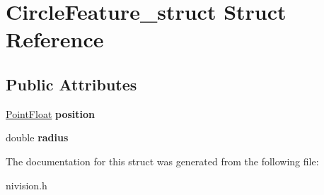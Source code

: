 \hypertarget{structCircleFeature__struct}{\section{\-Circle\-Feature\-\_\-struct \-Struct \-Reference}
\label{structCircleFeature__struct}
}
\subsection*{\-Public \-Attributes}
\begin{DoxyCompactItemize}
\item 
\hypertarget{structCircleFeature__struct_aa34aafa6b2b2462e2c330754e37bb0fd}{\hyperlink{structPointFloat__struct}{\-Point\-Float} {\bfseries position}}\label{structCircleFeature__struct_aa34aafa6b2b2462e2c330754e37bb0fd}

\item 
\hypertarget{structCircleFeature__struct_a12933357d4f3d65d1106413546f56586}{double {\bfseries radius}}\label{structCircleFeature__struct_a12933357d4f3d65d1106413546f56586}

\end{DoxyCompactItemize}


\-The documentation for this struct was generated from the following file\-:\begin{DoxyCompactItemize}
\item 
nivision.\-h\end{DoxyCompactItemize}
